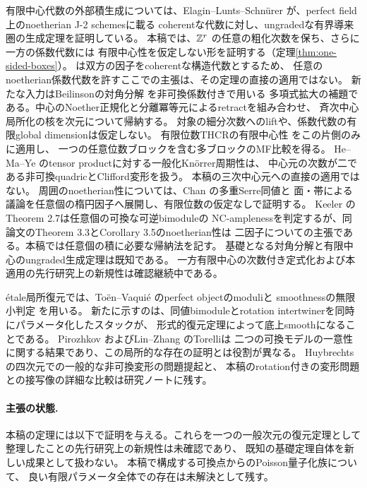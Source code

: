 有限中心代数の外部積生成については、Elagin--Lunts--Schn\"urer
\cite[Theorem 4.18]{ELS} が、perfect field上のnoetherian J-2 schemesに載る
coherentな代数に対し、ungradedな有界導来圏の生成定理を証明している。
本稿では、\(\mathbb Z^r\) の任意の粗化次数を保ち、さらに一方の係数代数には
有限中心性を仮定しない形を証明する（定理\ref{thm:one-sided-boxes}）。
\cite[Theorem 4.18]{ELS} は双方の因子をcoherentな構造代数とするため、
任意のnoetherian係数代数を許すここでの主張は、その定理の直接の適用ではない。
新たな入力はBeilinsonの対角分解 \cite{Beilinson} を非可換係数付きで用いる
多項式拡大の補題である。中心のNoether正規化と分離冪等元によるretractを組み合わせ、
斉次中心局所化の核を次元について帰納する。
対象の細分次数へのliftや、係数代数の有限global dimensionは仮定しない。
有限位数THCRの有限中心性 \cite[Corollary 2.3]{SmithTate} をこの片側のみに適用し、
一つの任意位数ブロックを含む多ブロックのMF比較を得る。
He--Ma--Ye \cite{HMY} のtensor productに対する一般化Kn\"orrer周期性は、
中心元の次数が二である非可換quadricとClifford変形を扱う。
本稿の三次中心元への直接の適用ではない。
周囲のnoetherian性については、Chan \cite{ChanMulti} の多重Serre同値と
面・帯による議論を任意個の楕円因子へ展開し、有限位数の仮定なしで証明する。
Keeler \cite{KeelerMulti} のTheorem 2.7は任意個の可換な可逆bimoduleの
NC-amplenessを判定するが、同論文のTheorem 3.3とCorollary 3.5のnoetherian性は
二因子についての主張である。本稿では任意個の積に必要な帰納法を記す。
基礎となる対角分解と有限中心のungraded生成定理は既知である。
一方有限中心の次数付き定式化および本適用の先行研究上の新規性は確認継続中である。

étale局所復元では、Toën--Vaquié \cite{TV} のperfect objectのmoduliと
smoothnessの無限小判定 \cite{Stacks} を用いる。
新たに示すのは、同値bimoduleとrotation intertwinerを同時にパラメータ化したスタックが、
形式的復元定理によって底上smoothになることである。
Pirozhkov \cite{Pirozhkov} およびLin--Zhang \cite{LZ} のTorelliは
二つの可換モデルの一意性に関する結果であり、この局所的な存在の証明とは役割が異なる。
Huybrechts \cite[Section 9]{HuyUpdate} の四次元での一般的な非可換変形の問題提起と、
本稿のrotation付きの変形問題との接写像の詳細な比較は研究ノートに残す。

\paragraph{主張の状態.}
本稿の定理には以下で証明を与える。これらを一つの一般次元の復元定理として
整理したことの先行研究上の新規性は未確認であり、
既知の基礎定理自体を新しい成果として扱わない。
本稿で構成する可換点からのPoisson量子化族について、
良い有限パラメータ全体での存在は未解決として残す。

